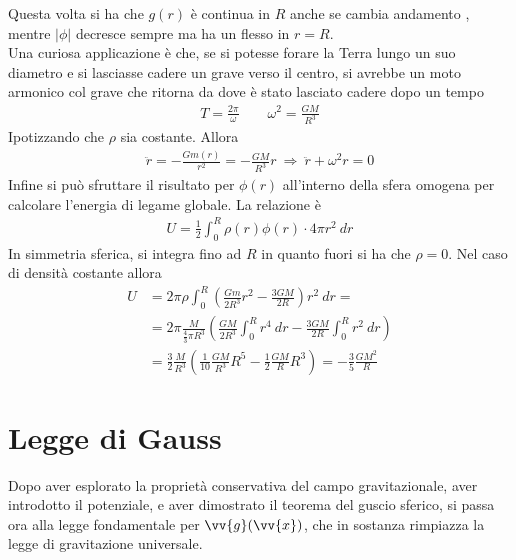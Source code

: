 \documentclass[a4paper, oneside]{book}
\begin{document}
\noindent
Questa volta si ha che $g(r)$ è continua in $R$ anche se cambia andamento , 
mentre $\left| \phi \right|$ decresce sempre ma ha un flesso in $r = R$. \\ 
Una curiosa applicazione è che, se si potesse forare la Terra lungo un suo 
diametro e si lasciasse cadere un grave verso il centro, si avrebbe un moto 
armonico col grave che ritorna da dove è stato lasciato cadere 
dopo un tempo
\begin{gather*}
    T = \frac{2\pi}{\omega} \qquad \omega ^{2} = \frac{GM}{R^{3}}
\end{gather*} 
Ipotizzando che $\rho$ sia costante. Allora
\begin{gather*}
    \ddot{r} = -\frac{Gm(r)}{r^{2}} = - \frac{GM}{R^{3}}r \ \Longrightarrow \ \ddot{r} + \omega^{2}r = 0  
\end{gather*}
Infine si può sfruttare il risultato per $\phi(r)$ all'interno della sfera omogena per 
calcolare l'energia di legame globale. La relazione è 
\begin{align}
    U = \frac{1}{2}\int_{0}^{R} \rho(r) \phi(r) \cdot 4\pi r^{2} \ dr  
\end{align}
In simmetria sferica, si integra fino ad $R$ in quanto fuori si ha che
$\rho = 0$. Nel caso di densità costante allora 
\begin{align*}
    U &= 2\pi \rho \int_{0}^{R}\left(\frac{Gm}{2R^{3}}r^{2} - \frac{3GM}{2R}\right)r^{2} \ dr = \\
    &= 2\pi \frac{M}{\frac{4}{3}\pi R^{3}}\left(\frac{GM}{2R^{3}} \int_{0}^{R} r^{4} \ dr - \frac{3GM}{2R} \int_{0}^{R} r^{2} \ dr  \right) \\
    &= \frac{3}{2}\frac{M}{R^{3}}\left(\frac{1}{10}\frac{GM}{R^{3}}R^{5} - \frac{1}{2}\frac{GM}{R}R^{3}\right) = -\frac{3}{5}\frac{GM^{2}}{R}
\end{align*}

\chapter{Legge di Gauss}
Dopo aver esplorato la proprietà conservativa del campo
gravitazionale, aver introdotto il potenziale, e aver dimostrato il teorema 
del guscio sferico, si passa ora alla legge fondamentale per $\vv{g}(\vv{x} )$, 
che in sostanza rimpiazza la legge di gravitazione universale. 
\end{document}
